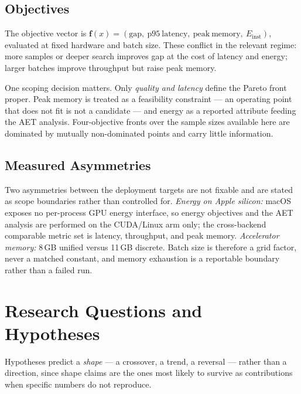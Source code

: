 \documentclass[11pt,a4paper,twocolumn]{article}
\newcommand{\vect}[1]{\boldsymbol{#1}}
\begin{document}
\subsection{Objectives}

The objective vector is
$\vect{f}(x) = (\mathrm{gap},\ \mathrm{p95\ latency},\ \mathrm{peak\ memory},\ E_{\mathrm{inst}})$,
evaluated at fixed hardware and batch size. These conflict in the relevant regime:
more samples or deeper search improves gap at the cost of latency and energy;
larger batches improve throughput but raise peak memory.

One scoping decision matters. Only \emph{quality and latency} define the Pareto
front proper. Peak memory is treated as a feasibility constraint --- an operating
point that does not fit is not a candidate --- and energy as a reported attribute
feeding the AET analysis. Four-objective fronts over the sample sizes available
here are dominated by mutually non-dominated points and carry little information.

\subsection{Measured Asymmetries}

Two asymmetries between the deployment targets are not fixable and are stated as
scope boundaries rather than controlled for. \emph{Energy on Apple silicon:} macOS
exposes no per-process GPU energy interface, so energy objectives and the AET
analysis are performed on the CUDA/Linux arm only; the cross-backend comparable
metric set is latency, throughput, and peak memory. \emph{Accelerator memory:}
8\,GB unified versus 11\,GB discrete. Batch size is therefore a grid factor, never
a matched constant, and memory exhaustion is a reportable boundary rather than a
failed run.

\section{Research Questions and Hypotheses}

Hypotheses predict a \emph{shape} --- a crossover, a trend, a reversal --- rather
than a direction, since shape claims are the ones most likely to survive as
contributions when specific numbers do not reproduce.
\end{document}
